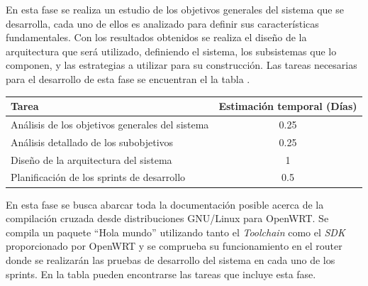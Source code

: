 \documentclass[12pt]{article}
\begin{document}
            En esta fase se realiza un estudio de los objetivos generales del sistema que se desarrolla, cada uno de ellos es analizado para definir sus características fundamentales. Con los resultados obtenidos se realiza el diseño de la arquitectura que será utilizado, definiendo el sistema, los subsistemas que lo componen, y las estrategias a utilizar para su construcción. Las tareas necesarias para el desarrollo de esta fase se encuentran el la tabla .

            \begin{tabular}{|l|c|}
                \hline
                \textbf{Tarea}                                                              &   \textbf{Estimación temporal} (Días) \\           
                \hline
                Análisis de los objetivos generales del sistema                             &   0.25                                \\
                Análisis detallado de los subobjetivos                                      &   0.25                                \\
                Diseño de la arquitectura del sistema                                       &   1                                   \\
                Planificación de los sprints de desarrollo                                  &   0.5                                 \\
                \hline
            \end{tabular}
            
            En esta fase se busca abarcar toda la documentación posible acerca de la compilación cruzada desde distribuciones GNU/Linux para OpenWRT. Se compila un paquete ``Hola mundo'' utilizando tanto el \textit{Toolchain} como el \textit{SDK} proporcionado por OpenWRT y se comprueba su funcionamiento en el router donde se realizarán las pruebas de desarrollo del sistema en cada uno de los sprints. En la tabla  pueden encontrarse las tareas que incluye esta fase.
\end{document}
